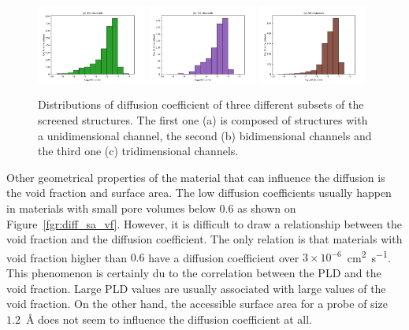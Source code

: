 \documentclass[main]{subfiles}
\begin{document}
\begin{figure}[ht]
  \centering
    \includegraphics[width=0.32\textwidth]{figures/5-diffusion/histogram_chan1D.pdf}
    \includegraphics[width=0.32\textwidth]{figures/5-diffusion/histogram_chan2D.pdf}
    \includegraphics[width=0.32\textwidth]{figures/5-diffusion/histogram_chan3D.pdf}
    \caption{ Distributions of diffusion coefficient of three different subsets of the screened structures. The first one (a) is composed of structures with a unidimensional channel, the second (b) bidimensional channels and the third one (c) tridimensional channels. }\label{fgr:hist_diffusion_chandim}
\end{figure}

Other geometrical properties of the material that can influence the diffusion is the void fraction and surface area. The low diffusion coefficients usually happen in materials with small pore volumes below $0.6$ as shown on Figure~\ref{fgr:diff_sa_vf}. However, it is difficult to draw a relationship between the void fraction and the diffusion coefficient. The only relation is that materials with void fraction higher than $0.6$ have a diffusion coefficient over $3\times 10^{-6}$~\si{\square\cm\per\s}. This phenomenon is certainly du to the correlation between the PLD and the void fraction. Large PLD values are usually associated with large values of the void fraction. On the other hand, the accessible surface area for a probe of size $1.2$~\si{\angstrom} does not seem to influence the diffusion coefficient at all. 
\end{document}
